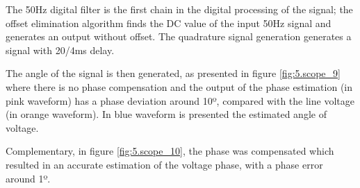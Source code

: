 	The 50Hz digital filter is the first chain in the digital processing of the signal; the offset elimination algorithm finds the DC value of the input 50Hz signal and generates an output without offset. 
	The quadrature signal generation generates a signal with 20/4ms delay. 
	
	The angle of the signal is then generated, as presented in figure \ref{fig:5.scope_9} where there is no phase compensation and the output of the phase estimation (in pink waveform) has a phase deviation around 10º, compared with the line voltage (in orange waveform). In blue waveform is presented the estimated angle of voltage.
	
	Complementary, in figure \ref{fig:5.scope_10}, the phase was compensated which resulted in an accurate estimation of the voltage phase, with a phase error around 1º.
	

